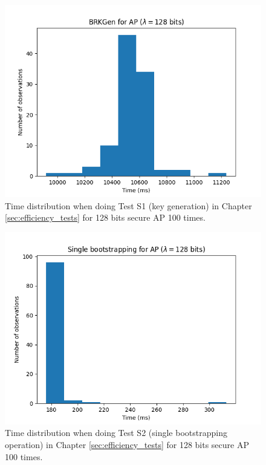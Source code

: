 


\begin{figure}[ht]
    \centering
    \includegraphics[width=0.8\linewidth]{data/figures/AP_STD128_BRKGen.png}
    \caption{Time distribution when doing Test S1 (key generation) in Chapter \ref{sec:efficiency_tests} for 128 bits secure AP 100 times.}
    \label{fig:distr_ap128_keygen}
\end{figure}

\begin{figure}[ht]
    \centering
    \includegraphics[width=0.8\linewidth]{data/figures/AP_STD128_Single_bootstrapping.png}
    \caption{Time distribution when doing Test S2 (single bootstrapping operation) in Chapter \ref{sec:efficiency_tests} for 128 bits secure AP 100 times.}
    \label{fig:distr_ap128_bs}
\end{figure}

